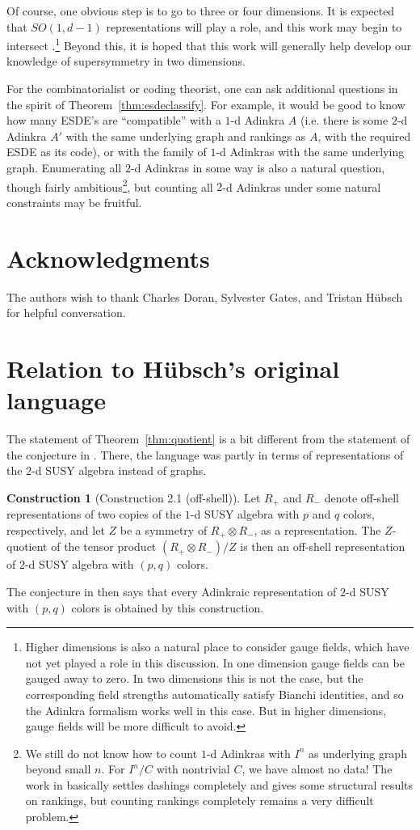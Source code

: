 \documentclass[12pt,twoside,singlespace]{article}
\numberwithin{equation}{section}
\theoremstyle{definition}
\newtheorem{construction}[equation]{Construction}
\begin{document}
Of course, one obvious step is to go to three or four dimensions.  It is expected that $SO(1,d-1)$ representations will play a role, and this work may begin to intersect \cite{faux:dimensional_enhancement,faux:spin_holography}.\footnote{Higher dimensions is also a natural place to consider gauge fields, which have not yet played a role in this discussion.  In one dimension gauge fields can be gauged away to zero.  In two dimensions this is not the case, but the corresponding field strengths automatically satisfy Bianchi identities, and so the Adinkra formalism works well in this case.  But in higher dimensions, gauge fields will be more difficult to avoid.} Beyond this, it is hoped that this work will generally help develop our knowledge of supersymmetry in two dimensions.

For the combinatorialist or coding theorist, one can ask additional questions in the spirit of Theorem~\ref{thm:esdeclassify}. For example, it would be good to know how many ESDE's are ``compatible'' with a $1$-d Adinkra $A$ (i.e. there is some $2$-d Adinkra $A'$ with the same underlying graph and rankings as $A$, with the required ESDE as its code), or with the family of $1$-d Adinkras with the same underlying graph. Enumerating all $2$-d Adinkras in some way is also a natural question, though fairly ambitious\footnote{We still do not know how to count $1$-d Adinkras with $I^n$ as underlying graph beyond small $n$. For $I^n/C$ with nontrivial $C$, we have almost no data! The work in \cite{zhang:adinkras} basically settles dashings completely and gives some structural results on rankings, but counting rankings completely remains a very difficult problem.}, but counting all $2$-d Adinkras under some natural constraints may be fruitful.

\section*{Acknowledgments}
The authors wish to thank Charles Doran, Sylvester Gates, and Tristan H\"ubsch for helpful conversation.

\appendix

\section{Relation to H\"ubsch's original language}
\label{app:repn}
The statement of Theorem~\ref{thm:quotient} is a bit different from the statement of the conjecture in \cite{hubsch:weaving}.  There, the language was partly in terms of representations of the $2$-d SUSY algebra instead of graphs.
\begin{construction}[Construction 2.1 (off-shell)] Let $R_+$ and $R_-$ denote off-shell representations of two copies of the $1$-d SUSY algebra with $p$ and $q$ colors, respectively, and let $Z$ be a symmetry of $R_+ \otimes R_-$, as a representation. The $Z$-quotient of the tensor product $(R_+ \otimes R_-)/Z$ is then an off-shell representation of $2$-d SUSY algebra with $(p,q)$ colors.
\end{construction}
The conjecture in \cite{hubsch:weaving} then says that every Adinkraic representation of $2$-d SUSY with $(p,q)$ colors is obtained by this construction.
\end{document}
